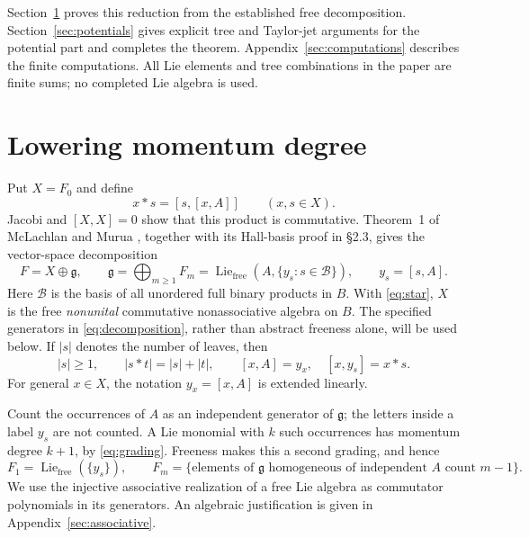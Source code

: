 \documentclass[11pt]{article}
\newcommand{\g}{\mathfrak g}
\newcommand{\Lie}{\operatorname{Lie}}
\begin{document}
Section~\ref{sec:lowering} proves this reduction from the established free
decomposition. Section~\ref{sec:potentials} gives explicit tree and Taylor-jet
arguments for the potential part and completes the theorem.
Appendix~\ref{sec:computations} describes the finite computations. All Lie
elements and tree combinations in the paper are finite sums; no completed
Lie algebra is used.

\section{Lowering momentum degree}\label{sec:lowering}

Put $X=F_0$ and define
\begin{equation}\label{eq:star}
 x*s=[s,[x,A]]\qquad(x,s\in X).
\end{equation}
Jacobi and $[X,X]=0$ show that this product is commutative. Theorem~1 of
McLachlan and Murua \cite{MM}, together with its Hall-basis proof in
\S2.3, gives the vector-space decomposition
\begin{equation}\label{eq:decomposition}
 F=X\oplus\g,\qquad
 \g=\bigoplus_{m\ge1}F_m
    =\Lie_{\mathrm{free}}(A,\{y_s:s\in\mathcal B\}),
 \qquad y_s=[s,A].
\end{equation}
Here $\mathcal B$ is the basis of all unordered full binary products in $B$.
With \eqref{eq:star}, $X$ is the free \emph{nonunital} commutative
nonassociative algebra on $B$. The specified generators in
\eqref{eq:decomposition}, rather than abstract freeness alone, will be used
below. If $|s|$ denotes the number of leaves, then
\[
 |s|\ge1,\qquad |s*t|=|s|+|t|,
 \qquad [x,A]=y_x,\quad [x,y_s]=x*s.
\]
For general $x\in X$, the notation $y_x=[x,A]$ is extended linearly.

Count the occurrences of $A$ as an independent generator of $\g$;
the letters inside a label $y_s$ are not counted. A Lie monomial with $k$
such occurrences has momentum degree $k+1$, by
\eqref{eq:grading}. Freeness makes this a second grading, and hence
\begin{equation}\label{eq:Acount}
 F_1=\Lie_{\mathrm{free}}(\{y_s\}),\qquad
 F_m=\{\text{elements of $\g$ homogeneous of independent $A$ count $m-1$}\}.
\end{equation}
We use the injective associative realization of a free Lie algebra as
commutator polynomials in its generators. An algebraic justification is given
in Appendix~\ref{sec:associative}.
\end{document}

